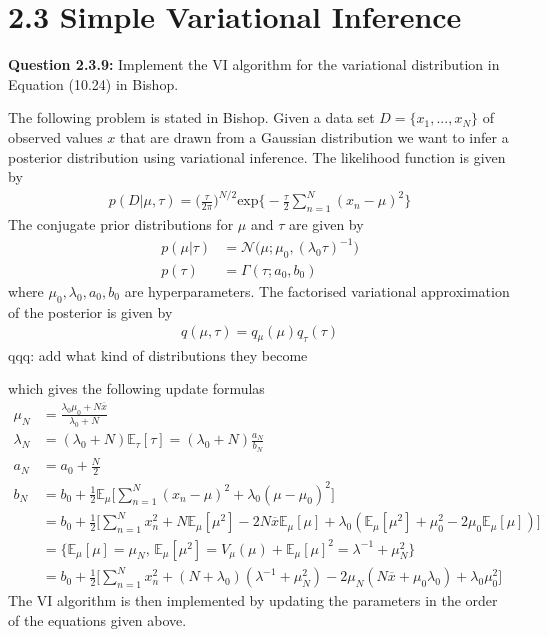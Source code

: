 \section*{2.3 Simple Variational Inference}

\begin{tcolorbox}
\textbf{Question 2.3.9:}
Implement the VI algorithm for the variational distribution in Equation (10.24) in Bishop.
\end{tcolorbox}

The following problem is stated in Bishop. Given a data set $D = \{x_1,...,x_N\}$ of observed values $x$ that are drawn from a Gaussian distribution we want to infer a posterior distribution using variational inference. The likelihood function is given by
\begin{align*}
  p(D|\mu, \tau) = \bigg( \frac{\tau}{2 \pi} \bigg)^{N/2} \text{exp} \bigg\{ - \frac{\tau}{2} \sum_{n=1}^N (x_n-\mu)^2 \bigg\}
\end{align*}
The conjugate prior distributions for $\mu$ and $\tau$ are given by
\begin{align*}
  p(\mu|\tau) & = \mathcal{N} \big( \mu;\mu_0, (\lambda_0\tau)^{-1} \big) \\
  p(\tau) & = \Gamma(\tau;a_0, b_0)
\end{align*}
where $\mu_0, \lambda_0, a_0, b_0$ are hyperparameters. The factorised variational approximation of the posterior is given by
\begin{align*}
  q(\mu, \tau) = q{_\mu}(\mu)q_{\tau}(\tau)
\end{align*}
qqq: add what kind of distributions they become

which gives the following update formulas
\begin{align}
  \mu_N & = \frac{\lambda_0 \mu_0 + N \overline{x}}{\lambda_0 + N}\\
  \lambda_N & = (\lambda_0 + N)\mathbb{E}_{\tau}[\tau] = (\lambda_0 + N) \frac{a_N}{b_N}\\
  a_N & = a_0 + \frac{N}{2} \\
  b_N & = b_0 + \frac{1}{2} \mathbb{E}_{\mu}\Bigg[ \sum_{n=1}^N (x_n - \mu)^2 + \lambda_0 (\mu - \mu_0)^2 \Bigg] \nonumber\\
  & = b_0 + \frac{1}{2} \Bigg[ \sum_{n=1}^N x_n^2 + N \mathbb{E}_{\mu}[\mu^2] - 2N\overline{x}\mathbb{E}_{\mu}[\mu]
          + \lambda_0(\mathbb{E}_{\mu}[\mu^2] + \mu_0^2 - 2\mu_0 \mathbb{E}_{\mu}[\mu]) \Bigg] \nonumber \\
  & = \bigg \{ \mathbb{E}_{\mu}[\mu] = \mu_N , \, \mathbb{E}_{\mu}[\mu^2] = V_{\mu}(\mu) + \mathbb{E}_{\mu}[\mu]^2 = \lambda^{-1} + \mu_N^2 \bigg \} \nonumber \\
  & = b_0 + \frac{1}{2} \Bigg[ \sum_{n=1}^N x_n^2 + (N + \lambda_0)(\lambda^{-1} + \mu_N^2) - 2\mu_N(N\overline{x} + \mu_0 \lambda_0)
          + \lambda_0 \mu_0^2 \Bigg]
\end{align}
The VI algorithm is then implemented by updating the parameters in the order of the equations given above.

